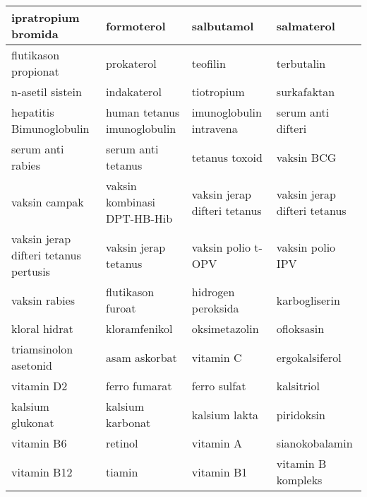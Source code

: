 \begin{longtable}{|p{}|p{}|p{}|p{}|}
	ipratropium bromida & formoterol & salbutamol & salmaterol \\ \hline
	flutikason propionat & prokaterol & teofilin & terbutalin \\ \hline
	n-asetil sistein & indakaterol & tiotropium & surkafaktan \\ \hline
	hepatitis Bimunoglobulin & human tetanus imunoglobulin & imunoglobulin intravena & serum anti difteri \\ \hline
	serum anti rabies & serum anti tetanus & tetanus toxoid & vaksin BCG \\ \hline
	vaksin campak & vaksin kombinasi DPT-HB-Hib & vaksin jerap difteri tetanus & vaksin jerap difteri tetanus \\ \hline
	vaksin jerap difteri tetanus pertusis & vaksin jerap tetanus & vaksin polio t-OPV & vaksin polio IPV \\ \hline
	vaksin rabies & flutikason furoat & hidrogen peroksida & karbogliserin \\ \hline
	kloral hidrat & kloramfenikol & oksimetazolin & ofloksasin \\ \hline
	triamsinolon asetonid & asam askorbat & vitamin C & ergokalsiferol \\ \hline
	vitamin D2 & ferro fumarat & ferro sulfat & kalsitriol \\ \hline
	kalsium glukonat & kalsium karbonat & kalsium lakta & piridoksin \\ \hline
	vitamin B6 & retinol & vitamin A & sianokobalamin \\ \hline
	vitamin B12 & tiamin & vitamin B1 & vitamin B kompleks \\ \hline
\end{longtable}